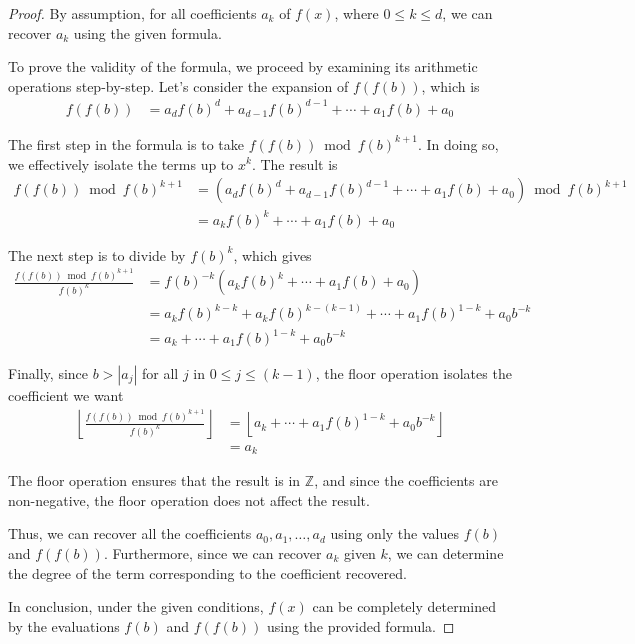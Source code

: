 \documentclass[12pt,reqno]{article}
\theoremstyle{plain}
\theoremstyle{definition}
\newcommand{\floor}[1]{\left\lfloor #1 \right\rfloor}
\begin{document}
\begin{proof}
By assumption, for all coefficients $a_k$ of $f(x)$, where $0 \leq k \leq d$, we can recover $a_k$ using the given formula.

To prove the validity of the formula, we proceed by examining its arithmetic operations step-by-step. Let's consider the expansion of $f(f(b))$, which is
\begin{align*}
f(f(b)) &= a_d f(b)^d + a_{d-1} f(b)^{d-1} + \cdots + a_1 f(b) + a_0
\end{align*}

The first step in the formula is to take $f(f(b)) \bmod{f(b)^{k + 1}}$. In doing so, we effectively isolate the terms up to $x^k$. The result is
\begin{align*}
f(f(b)) \bmod{f(b)^{k + 1}} &= (a_d f(b)^d + a_{d-1} f(b)^{d-1} + \cdots + a_1 f(b) + a_0) \bmod{f(b)^{k + 1}} \\
&= a_k f(b)^k + \cdots + a_1 f(b) + a_0 
\end{align*}

The next step is to divide by $f(b)^k$, which gives
\begin{align*}
\frac{f(f(b))  \bmod{f(b)^{k + 1}}}{f(b)^{k}} &= f(b)^{-k} (a_k f(b)^k + \cdots + a_1 f(b) + a_0) \\
&= a_k f(b)^{k-k} + a_k f(b)^{k-(k-1)} + \cdots + a_1 f(b)^{1-k} + a_0 b^{-k} \\
&= a_k + \cdots + a_1 f(b)^{1-k} + a_0 b^{-k}
\end{align*}

Finally, since $b > |a_j|$ for all $j$ in $0 \leq j \leq (k-1)$, the floor operation isolates the coefficient we want
\begin{align*}
\floor{\frac{f(f(b)) \bmod{f(b)^{k + 1}}}{f(b)^{k}}}
&= \floor{a_k + \cdots + a_1 f(b)^{1-k} + a_0 b^{-k}} \\
&= a_k
\end{align*}

The floor operation ensures that the result is in $\mathbb{Z}$, and since the coefficients are non-negative, the floor operation does not affect the result.

Thus, we can recover all the coefficients $a_0, a_1, \ldots, a_d$ using only the values $f(b)$ and $f(f(b))$. Furthermore, since we can recover $a_k$ given $k$, we can determine the degree of the term corresponding to the coefficient recovered.

In conclusion, under the given conditions, $f(x)$ can be completely determined by the evaluations $f(b)$ and $f(f(b))$ using the provided formula.
\end{proof}
\end{document}

